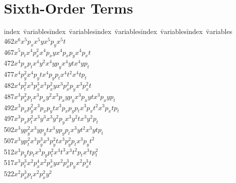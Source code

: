 \section{Sixth-Order Terms}
\indent
\begin{tabbing}
index\ \=variables\kern1cm\=index\ \=variables\kern1cm\=
index\ \=variables\kern1cm\=index\ \=variables\kern1cm\=
index\ \=variables\\
462\>$x  ^6             $\>$x  ^5 p_x         $\>$x  ^5 y           $\>$x  ^5 p_y         $\>$x  ^5 t           $\\
467\>$x  ^5 p_t         $\>$x  ^4 p_x^2       $\>$x  ^4 p_xy        $\>$x  ^4 p_xp_y      $\>$x  ^4 p_xt        $\\
472\>$x  ^4 p_xp_t      $\>$x  ^4 y  ^2       $\>$x  ^4 y  p_y      $\>$x  ^4 y  t        $\>$x  ^4 y  p_t      $\\
477\>$x  ^4 p_y^2       $\>$x  ^4 p_yt        $\>$x  ^4 p_yp_t      $\>$x  ^4 t  ^2       $\>$x  ^4 t  p_t      $\\
482\>$x  ^4 p_t^2       $\>$x  ^3 p_x^3       $\>$x  ^3 p_x^2 y     $\>$x  ^3 p_x^2 p_y   $\>$x  ^3 p_x^2 t     $\\
487\>$x  ^3 p_x^2 p_t   $\>$x  ^3 p_xy  ^2    $\>$x  ^3 p_xy  p_y   $\>$x  ^3 p_xy  t     $\>$x  ^3 p_xy  p_t   $\\
492\>$x  ^3 p_xp_y^2    $\>$x  ^3 p_xp_yt     $\>$x  ^3 p_xp_yp_t   $\>$x  ^3 p_xt  ^2    $\>$x  ^3 p_xt  p_t   $\\
497\>$x  ^3 p_xp_t^2    $\>$x  ^3 y  ^3       $\>$x  ^3 y  ^2 p_y   $\>$x  ^3 y  ^2 t     $\>$x  ^3 y  ^2 p_t   $\\
502\>$x  ^3 y  p_y^2    $\>$x  ^3 y  p_yt     $\>$x  ^3 y  p_yp_t   $\>$x  ^3 y  t  ^2    $\>$x  ^3 y  t  p_t   $\\
507\>$x  ^3 y  p_t^2    $\>$x  ^3 p_y^3       $\>$x  ^3 p_y^2 t     $\>$x  ^3 p_y^2 p_t   $\>$x  ^3 p_yt  ^2    $\\
512\>$x  ^3 p_yt  p_t   $\>$x  ^3 p_yp_t^2    $\>$x  ^3 t  ^3       $\>$x  ^3 t  ^2 p_t   $\>$x  ^3 t  p_t^2    $\\
517\>$x  ^3 p_t^3       $\>$x  ^2 p_x^4       $\>$x  ^2 p_x^3 y     $\>$x  ^2 p_x^3 p_y   $\>$x  ^2 p_x^3 t     $\\
522\>$x  ^2 p_x^3 p_t   $\>$x  ^2 p_x^2 y  ^2 $\>

\end{tabbing}
